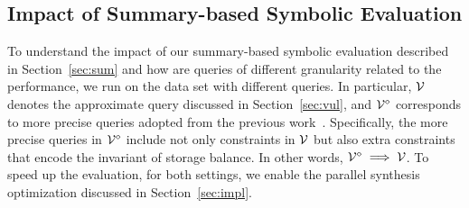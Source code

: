 \subsection{Impact of Summary-based Symbolic Evaluation}\label{sec:expr}

To understand the impact of our summary-based symbolic evaluation described 
in Section~\ref{sec:sum} and how are queries of different granularity related to the performance, we run \toolname on the \etherscan data set with different queries. In particular, $\mathcal{V}$ denotes the approximate query discussed in Section~\ref{sec:vul}, and $\mathcal{V}^{\diamond}$ corresponds to more precise queries adopted from the previous work~\cite{Hirai17}. Specifically, the more precise queries in $\mathcal{V}^{\diamond}$ include not only constraints in $\mathcal{V}$ but also extra constraints that encode the invariant of storage balance. In other words, $\mathcal{V}^{\diamond} \implies \mathcal{V}$.
To speed up the evaluation, for both settings, we enable the
parallel synthesis optimization discussed in Section~\ref{sec:impl}. 
%

